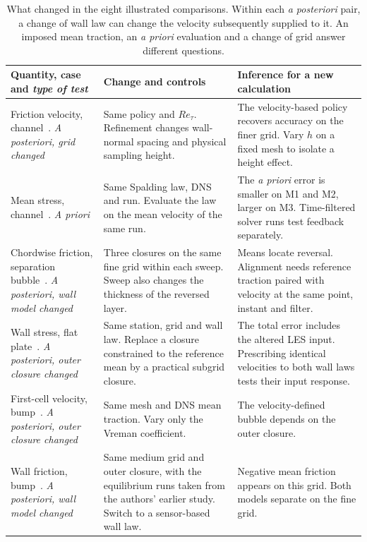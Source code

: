 \begin{table}[t]
\caption{What changed in the eight illustrated comparisons. Within each \emph{a posteriori} pair, a change of wall law can change the velocity subsequently supplied to it. An imposed mean traction, an \emph{a priori} evaluation and a change of grid answer different questions.}\label{tab:evidence}
\footnotesize
\begin{tabular*}{\textwidth}{@{\extracolsep{\fill}}>{\raggedright\arraybackslash}p{}>{\raggedright\arraybackslash}p{}>{\raggedright\arraybackslash}p{}@{}}
\toprule
Quantity, case and \emph{type of test} & Change and controls & Inference for a new calculation \\
\midrule
Friction velocity, channel~\cite{BaeKoumoutsakos2022}. \emph{A posteriori, grid changed} & Same policy and $Re_\tau$. Refinement changes wall-normal spacing and physical sampling height. & The velocity-based policy recovers accuracy on the finer grid. Vary $h$ on a fixed mesh to isolate a height effect. \\
Mean stress, channel~\cite{Mukha2025}. \emph{A priori} & Same Spalding law, DNS and run. Evaluate the law on the mean velocity of the same run. & The \emph{a priori} error is smaller on M1 and M2, larger on M3. Time-filtered solver runs test feedback separately. \\
Chordwise friction, separation bubble~\cite{Hayat2024preprint,HayatPark2025}. \emph{A posteriori, wall model changed} & Three closures on the same fine grid within each sweep. Sweep also changes the thickness of the reversed layer. & Means locate reversal. Alignment needs reference traction paired with velocity at the same point, instant and filter. \\
Wall stress, flat plate~\cite{LozanoDuranBae2023}. \emph{A posteriori, outer closure changed} & Same station, grid and wall law. Replace a closure constrained to the reference mean by a practical subgrid closure. & The total error includes the altered LES input. Prescribing identical velocities to both wall laws tests their input response. \\
First-cell velocity, bump~\cite{ZhouBae2024}. \emph{A posteriori, outer closure changed} & Same mesh and DNS mean traction. Vary only the Vreman coefficient. & The velocity-defined bubble depends on the outer closure. \\
Wall friction, bump~\cite{Agrawal2024}. \emph{A posteriori, wall model changed} & Same medium grid and outer closure, with the equilibrium runs taken from the authors' earlier study. Switch to a sensor-based wall law. & Negative mean friction appears on this grid. Both models separate on the fine grid. \\

\end{tabular*}
\end{table}
